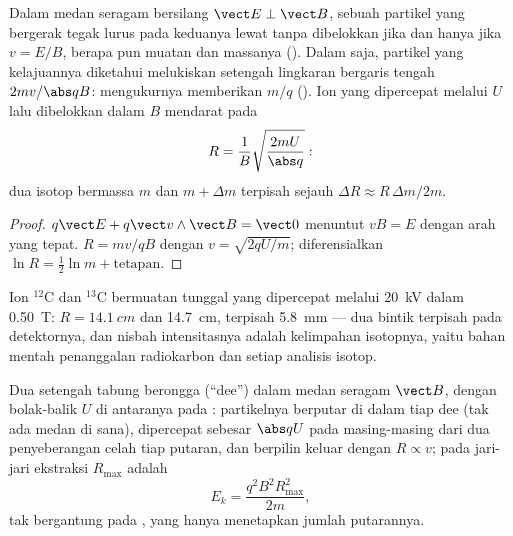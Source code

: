 \begin{proposition}\label{prop:b1:charged-particles:spectrometer}
Dalam medan seragam bersilang $\vect E \perp \vect B$, sebuah partikel yang
bergerak tegak lurus pada keduanya lewat tanpa dibelokkan jika dan hanya jika $v = E/B$,
berapa pun muatan dan massanya (\emph{}). Dalam  saja,
partikel yang kelajuannya diketahui melukiskan setengah lingkaran bergaris tengah $2mv/\abs qB$:
mengukurnya memberikan $m/q$ (\emph{}). Ion yang dipercepat
melalui  $U$ lalu dibelokkan dalam $B$ mendarat pada
\[
R = \frac{1}{B}\sqrt{\frac{2mU}{\abs q}} :
\]
dua isotop bermassa $m$ dan $m + \Delta m$ terpisah sejauh $\Delta R \approx
R\,\Delta m/2m$.
\end{proposition}

\begin{proof}
$q\vect E + q\vect v\wedge\vect B = \vect 0$ menuntut $vB = E$ dengan arah
yang tepat. $R = mv/qB$ dengan $v = \sqrt{2qU/m}$; diferensialkan
$\ln R = \tfrac12\ln m + \text{tetapan}$.
\end{proof}

\begin{example}\label{ex:b1:charged-particles:isotopes}
Ion $^{12}$C dan $^{13}$C bermuatan tunggal yang dipercepat melalui \qty{20}{kV}
dalam \qty{0.50}{T}: $R = \qty{14.1}{cm}$ dan \qty{14.7}{cm}, terpisah \qty{5.8}{mm}
--- dua bintik terpisah pada detektornya, dan nisbah intensitasnya adalah
kelimpahan isotopnya, yaitu bahan mentah penanggalan radiokarbon dan
setiap analisis isotop.
\end{example}

\begin{proposition}[Siklotron]\label{prop:b1:charged-particles:cyclotron}
Dua setengah tabung berongga (``dee'') dalam medan seragam $\vect B$, dengan
 bolak-balik $U$ di antaranya pada : partikelnya
berputar di dalam tiap dee (tak ada medan di sana), dipercepat sebesar
$\abs qU$ pada masing-masing dari dua penyeberangan celah tiap putaran, dan
berpilin keluar dengan $R \propto v$; pada jari-jari ekstraksi $R_{\max}$
 adalah
\[
E_k = \frac{q^2B^2R_{\max}^2}{2m},
\]
tak bergantung pada , yang hanya menetapkan jumlah putarannya.
\end{proposition}

